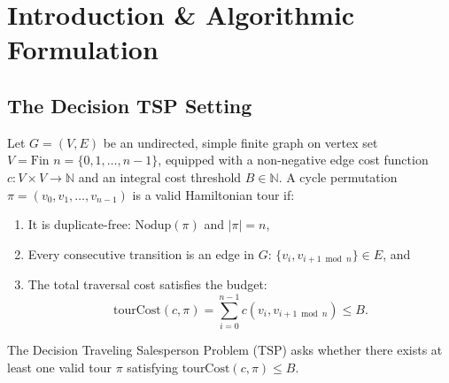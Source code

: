 \documentclass[11pt,a4paper]{article}
\renewcommand{\_}{\origunderscore\allowbreak}
\theoremstyle{plain}
\theoremstyle{definition}
\theoremstyle{remark}
\begin{document}
\begin{abstract}
Finally, we validate our formal theorems using executable Python benchmark engines (\texttt{branch\_and\_cut.py}, \texttt{adversarial\_instances.py}, \texttt{christofides.py}, and \texttt{structural\_rank.py}). Empirically, the fractional Held-Karp LP stalls at $x_e = 2/3$ on $P_{10}$ with zero remaining violated DFJ cuts, branch-and-cut evaluates \textbf{exactly $2^m - 1 = 2^{|V|/3} - 1$ nodes} on unsatisfiable Ring-of-Triangles instances ($m \in \{3, \dots, 9\}$) due to a half-integral LP blind spot ($x_e = 1/2$), contrasting with \textbf{constant 1 node} on bounded Cycle-Separation Rank instances, and empirical benchmarks across all 4 algorithmic components of Christofides confirm 100\% compliance with theoretical bounds.
\end{abstract}

\newpage
\tableofcontents
\newpage

\section{Introduction \& Algorithmic Formulation}

\subsection{The Decision TSP Setting}
Let $G = (V, E)$ be an undirected, simple finite graph on vertex set $V = \text{Fin } n = \{0, 1, \dots, n-1\}$, equipped with a non-negative edge cost function $c : V \times V \to \mathbb{N}$ and an integral cost threshold $B \in \mathbb{N}$. A cycle permutation $\pi = (v_0, v_1, \dots, v_{n-1})$ is a valid Hamiltonian tour if:
\begin{enumerate}
  \item It is duplicate-free: $\text{Nodup}(\pi)$ and $|\pi| = n$,
  \item Every consecutive transition is an edge in $G$: $\{v_i, v_{i+1 \bmod n}\} \in E$, and
  \item The total traversal cost satisfies the budget:
  \begin{equation}
    \text{tourCost}(c, \pi) = \sum_{i=0}^{n-1} c(v_i, v_{i+1 \bmod n}) \le B.
  \end{equation}
\end{enumerate}
The Decision Traveling Salesperson Problem ($\text{TSP}$) asks whether there exists at least one valid tour $\pi$ satisfying $\text{tourCost}(c, \pi) \le B$.
\end{document}
